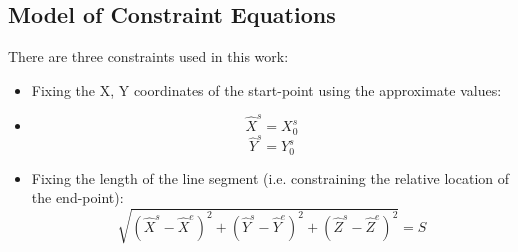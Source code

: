 

\subsection{Model of Constraint Equations}
\label{subsec:ConEqua}
There are three constraints used in this work:
\begin{itemize}
\item Fixing the X, Y coordinates of the start-point using the approximate values:
\item [] \begin{equation} \label{eq:constraint1}
\hat{X}^s=X^s_0
\end{equation}
\begin{equation} \label{eq:constraint2}
\hat{Y}^s=Y^s_0
\end{equation}
\item Fixing the length of the line segment (i.e. constraining the relative location of the end-point):
\begin{equation} \label{eq:constraint3}
\sqrt{(\hat{X}^s-\hat{X}^e)^2+(\hat{Y}^s-\hat{Y}^e)^2+(\hat{Z}^s-\hat{Z}^e)^2}=S
\end{equation}
\end{itemize}

